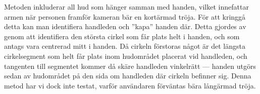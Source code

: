 Metoden inkluderar all hud som hänger samman med
handen, vilket innefattar armen när personen framför kameran bär en kortärmad
tröja.
För att
kringgå detta kan man identifiera handleden och ''kapa'' handen
där. Detta gjordes av  genom att identifiera den 
största cirkel
som får plats helt i handen, och som antags vara centrerad mitt i handen. Då
cirkeln förstoras något är det längsta cirkelsegment som helt får
plats inom hudområdet placerat vid handleden, och tangenten
till segmentet kommer då
skäre handleden vinkelrätt --- handen utgörs sedan av hudområdet på den
sida om handleden där cirkeln befinner sig. Denna metod har vi dock
inte testat, varför användaren förväntas bära
långärmad tröja.

